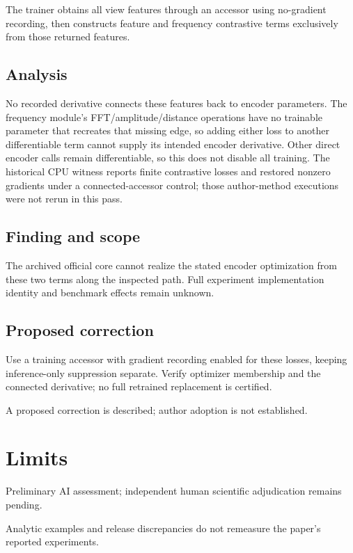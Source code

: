 \documentclass[11pt]{article}
\begin{document}
The trainer obtains all view features through an accessor using no-gradient recording, then constructs feature and frequency contrastive terms exclusively from those returned features.

\subsection*{Analysis}

No recorded derivative connects these features back to encoder parameters. The frequency module’s FFT/amplitude/distance operations have no trainable parameter that recreates that missing edge, so adding either loss to another differentiable term cannot supply its intended encoder derivative. Other direct encoder calls remain differentiable, so this does not disable all training. The historical CPU witness reports finite contrastive losses and restored nonzero gradients under a connected-accessor control; those author-method executions were not rerun in this pass.

\subsection*{Finding and scope}

The archived official core cannot realize the stated encoder optimization from these two terms along the inspected path. Full experiment implementation identity and benchmark effects remain unknown.

\subsection*{Proposed correction}

Use a training accessor with gradient recording enabled for these losses, keeping inference-only suppression separate. Verify optimizer membership and the connected derivative; no full retrained replacement is certified.

A proposed correction is described; author adoption is not established.

\section*{Limits}

Preliminary AI assessment; independent human scientific adjudication remains pending.\par

Analytic examples and release discrepancies do not remeasure the paper’s reported experiments.\par
\end{document}
